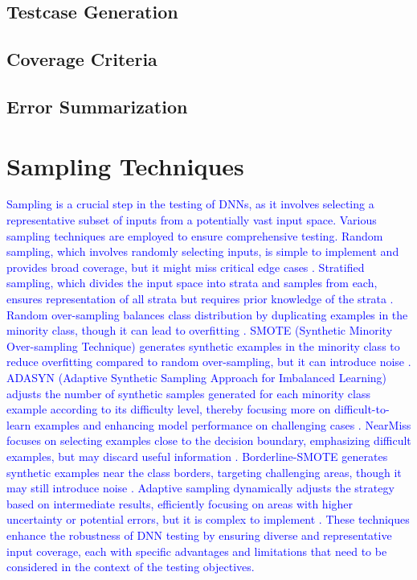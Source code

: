 \subsection{Testcase Generation}

\subsection{Coverage Criteria}

\subsection{Error Summarization}

\section{Sampling Techniques}
\textcolor{blue}{
Sampling is a crucial step in the testing of DNNs, as it involves selecting a representative subset of inputs from a potentially vast input space. Various sampling techniques are employed to ensure comprehensive testing. Random sampling, which involves randomly selecting inputs, is simple to implement and provides broad coverage, but it might miss critical edge cases \cite{Frey1997}. Stratified sampling, which divides the input space into strata and samples from each, ensures representation of all strata but requires prior knowledge of the strata \cite{Katz2017}. Random over-sampling balances class distribution by duplicating examples in the minority class, though it can lead to overfitting \cite{Chawla2002}. SMOTE (Synthetic Minority Over-sampling Technique) generates synthetic examples in the minority class to reduce overfitting compared to random over-sampling, but it can introduce noise \cite{Chawla2002}. ADASYN (Adaptive Synthetic Sampling Approach for Imbalanced Learning) adjusts the number of synthetic samples generated for each minority class example according to its difficulty level, thereby focusing more on difficult-to-learn examples and enhancing model performance on challenging cases \cite{He2008}. NearMiss focuses on selecting examples close to the decision boundary, emphasizing difficult examples, but may discard useful information \cite{Mani2003}. Borderline-SMOTE generates synthetic examples near the class borders, targeting challenging areas, though it may still introduce noise \cite{Han2005}. Adaptive sampling dynamically adjusts the strategy based on intermediate results, efficiently focusing on areas with higher uncertainty or potential errors, but it is complex to implement \cite{Roth2019}. These techniques enhance the robustness of DNN testing by ensuring diverse and representative input coverage, each with specific advantages and limitations that need to be considered in the context of the testing objectives.
}
